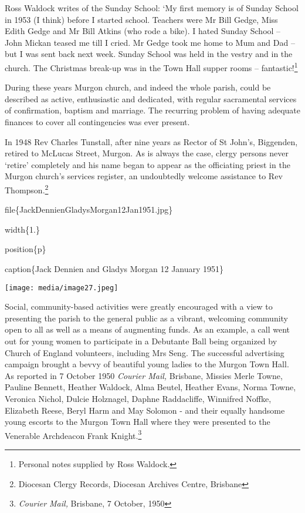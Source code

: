 Ross Waldock writes of the Sunday School: `My first memory is of Sunday School in 1953 (I think) before I started school. Teachers were Mr Bill Gedge, Miss Edith Gedge and Mr Bill Atkins (who rode a bike). I hated Sunday School -- John Mickan teased me till I cried. Mr Gedge took me home to Mum and Dad -- but I was sent back next week. Sunday School was held in the vestry and in the church. The Christmas break-up was in the Town Hall supper rooms -- fantastic!\footnote{Personal notes supplied by Ross Waldock.}

During these years Murgon church, and indeed the whole parish, could be described as active, enthusiastic and dedicated, with regular sacramental services of confirmation, baptism and marriage. The recurring problem of having adequate finances to cover all contingencies was ever present.

In 1948 Rev Charles Tunstall, after nine years as Rector of St John's, Biggenden, retired to McLucas Street, Murgon. As is always the case, clergy persons never `retire' completely and his name began to appear as the officiating priest in the Murgon church's services register, an undoubtedly welcome assistance to Rev Thompson.\footnote{Diocesan Clergy Records, Diocesan Archives Centre, Brisbane}

file\{JackDennienGladysMorgan12Jan1951.jpg\}

width\{1.\}

position\{p\}

caption\{Jack Dennien and Gladys Morgan 12 January 1951\}

\texttt{[image: media/image27.jpeg]}

Social, community-based activities were greatly encouraged with a view to presenting the parish to the general public as a vibrant, welcoming community open to all as well as a means of augmenting funds. As an example, a call went out for young women to participate in a Debutante Ball being organized by Church of England volunteers, including Mrs Seng. The successful advertising campaign brought a bevvy of beautiful young ladies to the Murgon Town Hall. As reported in 7 October 1950 \emph{Courier Mail,} Brisbane, Missies Merle Towne, Pauline Bennett, Heather Waldock, Alma Beutel, Heather Evans, Norma Towne, Veronica Nichol, Dulcie Holznagel, Daphne Raddacliffe, Winnifred Noffke, Elizabeth Reese, Beryl Harm and May Solomon - and their equally handsome young escorts to the Murgon Town Hall where they were presented to the Venerable Archdeacon Frank Knight.\footnote{\emph{Courier Mail,} Brisbane, 7 October, 1950}

